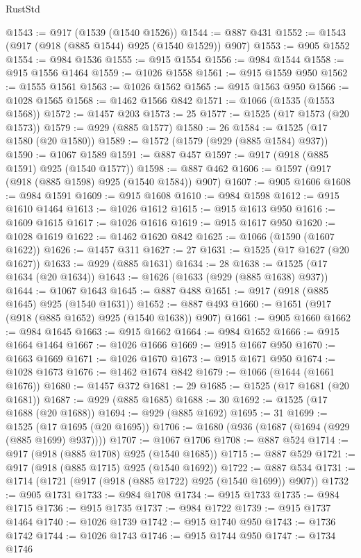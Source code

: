 \begin{lexlean}{RustStd}
\begin{coremodule}
@1543 := @917 (@1539 (@1540 @1526))
@1544 := @887 @431
@1552 := @1543 (@917 (@918 (@885 @1544) @925 (@1540 @1529)) @907)
@1553 := @905 @1552
@1554 := @984 @1536
@1555 := @915 @1554
@1556 := @984 @1544
@1558 := @915 @1556 @1464
@1559 := @1026 @1558
@1561 := @915 @1559 @950
@1562 := @1555 @1561
@1563 := @1026 @1562
@1565 := @915 @1563 @950
@1566 := @1028 @1565
@1568 := @1462 @1566 @842
@1571 := @1066 (@1535 (@1553 @1568))
@1572 := @1457 @203
@1573 := 25
@1577 := @1525 (@17 @1573 (@20 @1573))
@1579 := @929 (@885 @1577)
@1580 := 26
@1584 := @1525 (@17 @1580 (@20 @1580))
@1589 := @1572 (@1579 (@929 (@885 @1584) @937))
@1590 := @1067 @1589
@1591 := @887 @457
@1597 := @917 (@918 (@885 @1591) @925 (@1540 @1577))
@1598 := @887 @462
@1606 := @1597 (@917 (@918 (@885 @1598) @925 (@1540 @1584)) @907)
@1607 := @905 @1606
@1608 := @984 @1591
@1609 := @915 @1608
@1610 := @984 @1598
@1612 := @915 @1610 @1464
@1613 := @1026 @1612
@1615 := @915 @1613 @950
@1616 := @1609 @1615
@1617 := @1026 @1616
@1619 := @915 @1617 @950
@1620 := @1028 @1619
@1622 := @1462 @1620 @842
@1625 := @1066 (@1590 (@1607 @1622))
@1626 := @1457 @311
@1627 := 27
@1631 := @1525 (@17 @1627 (@20 @1627))
@1633 := @929 (@885 @1631)
@1634 := 28
@1638 := @1525 (@17 @1634 (@20 @1634))
@1643 := @1626 (@1633 (@929 (@885 @1638) @937))
@1644 := @1067 @1643
@1645 := @887 @488
@1651 := @917 (@918 (@885 @1645) @925 (@1540 @1631))
@1652 := @887 @493
@1660 := @1651 (@917 (@918 (@885 @1652) @925 (@1540 @1638)) @907)
@1661 := @905 @1660
@1662 := @984 @1645
@1663 := @915 @1662
@1664 := @984 @1652
@1666 := @915 @1664 @1464
@1667 := @1026 @1666
@1669 := @915 @1667 @950
@1670 := @1663 @1669
@1671 := @1026 @1670
@1673 := @915 @1671 @950
@1674 := @1028 @1673
@1676 := @1462 @1674 @842
@1679 := @1066 (@1644 (@1661 @1676))
@1680 := @1457 @372
@1681 := 29
@1685 := @1525 (@17 @1681 (@20 @1681))
@1687 := @929 (@885 @1685)
@1688 := 30
@1692 := @1525 (@17 @1688 (@20 @1688))
@1694 := @929 (@885 @1692)
@1695 := 31
@1699 := @1525 (@17 @1695 (@20 @1695))
@1706 := @1680 (@936 (@1687 (@1694 (@929 (@885 @1699) @937))))
@1707 := @1067 @1706
@1708 := @887 @524
@1714 := @917 (@918 (@885 @1708) @925 (@1540 @1685))
@1715 := @887 @529
@1721 := @917 (@918 (@885 @1715) @925 (@1540 @1692))
@1722 := @887 @534
@1731 := @1714 (@1721 (@917 (@918 (@885 @1722) @925 (@1540 @1699)) @907))
@1732 := @905 @1731
@1733 := @984 @1708
@1734 := @915 @1733
@1735 := @984 @1715
@1736 := @915 @1735
@1737 := @984 @1722
@1739 := @915 @1737 @1464
@1740 := @1026 @1739
@1742 := @915 @1740 @950
@1743 := @1736 @1742
@1744 := @1026 @1743
@1746 := @915 @1744 @950
@1747 := @1734 @1746

\end{coremodule}
\end{lexlean}
